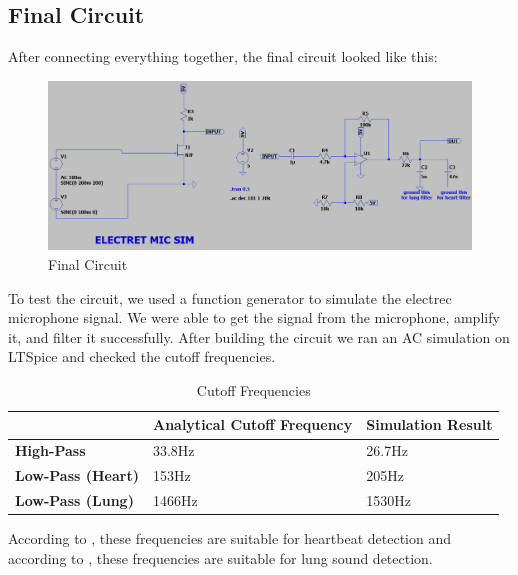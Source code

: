 \newpage
\thispagestyle{plain}

\subsection{Final Circuit}

After connecting everything together, the final circuit looked like this:

\begin{figure}[h]
	\centering
	\includegraphics[width=1\textwidth]{assets/final-circuit.png}
	\caption{Final Circuit}
	\label{fig:final_circuit}
\end{figure}

To test the circuit, we used a function generator to simulate the electrec microphone signal. We were able to get the signal from the microphone, amplify it, and filter it successfully. After building the circuit we ran an AC simulation on LTSpice and checked the cutoff frequencies.

\begin{table}[h]
	\begin{tabular}{l|l|l|}
		\cline{2-3}
		                                                & \textbf{Analytical Cutoff Frequency} & \textbf{Simulation Result} \\ \hline
		\multicolumn{1}{|l|}{\textbf{High-Pass}}        & 33.8Hz                               & 26.7Hz                     \\ \hline
		\multicolumn{1}{|l|}{\textbf{Low-Pass (Heart)}} & 153Hz                                & 205Hz                      \\ \hline
		\multicolumn{1}{|l|}{\textbf{Low-Pass (Lung)}}  & 1466Hz                               & 1530Hz                     \\ \hline
	\end{tabular}
	\caption{Cutoff Frequencies}
	\label{tab:cutoff_frequencies}
\end{table}

According to \textcite{Debbal2020}, these frequencies are suitable for heartbeat detection and according to \textcite{Gross2000}, these frequencies are suitable for lung sound detection.

